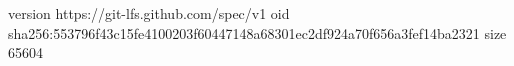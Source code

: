 version https://git-lfs.github.com/spec/v1
oid sha256:553796f43c15fe4100203f60447148a68301ec2df924a70f656a3fef14ba2321
size 65604
